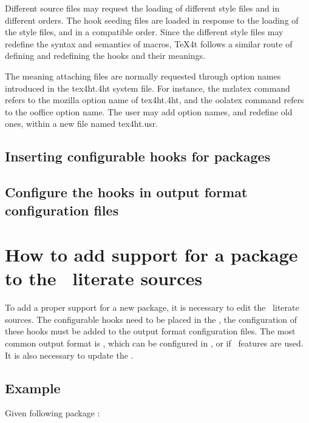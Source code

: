 Different source files may request the loading of different style files and in
different orders. The hook seeding files are loaded in response to the loading
of the style files, and in a compatible order. Since the different style files
may redefine the syntax and semantics of macros, TeX4t follows a similar route
of defining and redefining the hooks and their meanings.

The meaning attaching files are normally requested through option names
introduced in the tex4ht.4ht system file. For instance, the mzlatex command
refers to the mozilla option name of tex4ht.4ht, and the oolatex command refers
to the ooffice option name. The user may add option names, and redefine old
ones, within a new file named tex4ht.usr.

\subsection{Inserting configurable hooks for packages}

\subsection{Configure the hooks in output format configuration files}

\section{How to add support for a package to the \texfourht\ literate sources}

To add a proper support for a new package, it is necessary to edit the 
\texfourht\ literate sources. The configurable hooks need to be placed in the ,
the configuration of these hooks must be added to the output format configuration files.
The most common output format is \HTML, which can be configured in , or 
 if \HTMLV\ features are used. It is also necessary to update the
.

\subsection{Example}

Given following package :


